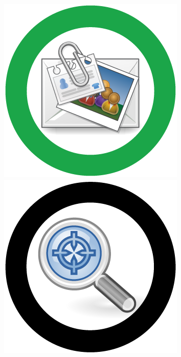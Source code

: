 \documentclass{letter}
\begin{document}
\includegraphics{stickers/sticker_pii}
\includegraphics{stickers/sticker_admin} \\
\end{document}
